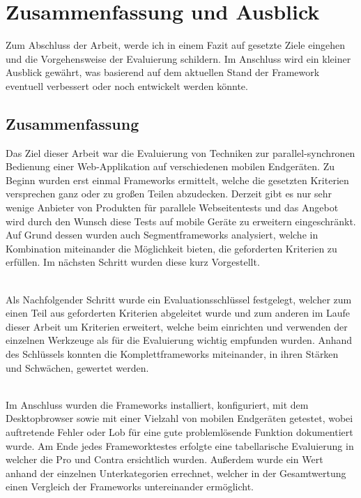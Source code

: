 \chapter{Zusammenfassung und Ausblick}
Zum Abschluss der Arbeit, werde ich in einem Fazit auf gesetzte Ziele eingehen und die Vorgehensweise der Evaluierung schildern. Im Anschluss wird ein kleiner Ausblick gewährt, was basierend auf dem aktuellen Stand der Framework eventuell verbessert oder noch entwickelt werden könnte.

\section{Zusammenfassung}
Das Ziel dieser Arbeit war die Evaluierung von Techniken zur
parallel-synchronen Bedienung einer
Web-Applikation auf verschiedenen
mobilen Endgeräten. Zu Beginn wurden erst einmal Frameworks ermittelt, welche die gesetzten Kriterien versprechen ganz oder zu großen Teilen abzudecken. 
Derzeit gibt es nur sehr wenige Anbieter von Produkten für parallele Webseitentests und das Angebot wird durch den Wunsch diese Tests auf mobile Geräte zu erweitern eingeschränkt. Auf Grund dessen wurden auch Segmentframeworks analysiert, welche in Kombination miteinander die Möglichkeit bieten, die geforderten Kriterien zu erfüllen. Im nächsten Schritt wurden diese kurz Vorgestellt.

\\Als Nachfolgender Schritt wurde ein Evaluationsschlüssel festgelegt, welcher zum einen Teil aus geforderten Kriterien abgeleitet wurde und zum anderen im Laufe dieser Arbeit um Kriterien erweitert, welche beim einrichten und verwenden der einzelnen Werkzeuge als für die Evaluierung wichtig empfunden wurden. Anhand des Schlüssels konnten die Komplettframeworks miteinander, in ihren Stärken und Schwächen, gewertet werden.

\\Im Anschluss wurden die Frameworks installiert, konfiguriert, mit dem Desktopbrowser sowie mit einer Vielzahl von mobilen Endgeräten getestet, wobei auftretende Fehler oder Lob für eine gute problemlösende Funktion dokumentiert wurde. Am Ende jedes Frameworktestes erfolgte eine tabellarische Evaluierung in welcher die Pro und Contra ersichtlich wurden. Außerdem wurde ein Wert anhand der einzelnen Unterkategorien errechnet, welcher in der Gesamtwertung einen Vergleich der Frameworks untereinander ermöglicht.

